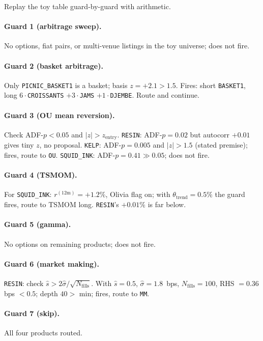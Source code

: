 Replay the toy table guard-by-guard with arithmetic.

\paragraph{Guard 1 (arbitrage sweep).} No options, fiat pairs, or
multi-venue listings in the toy universe; does not fire.

\paragraph{Guard 2 (basket arbitrage).} Only \texttt{PICNIC\_BASKET1}
is a basket; basis $z = +2.1 > 1.5$. Fires: short \texttt{BASKET1},
long $6 \cdot$\texttt{CROISSANTS} $+ 3 \cdot$\texttt{JAMS} $+ 1
\cdot$\texttt{DJEMBE}. Route and continue.

\paragraph{Guard 3 (OU mean reversion).} Check ADF-$p < 0.05$ and
$|z| > z_{\text{entry}}$. \texttt{RESIN}: ADF-$p = 0.02$ but
autocorr $+0.01$ gives tiny $z$, no proposal. \texttt{KELP}: ADF-$p
= 0.005$ and $|z| > 1.5$ (stated premise); fires, route to
\texttt{OU}. \texttt{SQUID\_INK}: ADF-$p = 0.41 \gg 0.05$; does not
fire.

\paragraph{Guard 4 (TSMOM).} For \texttt{SQUID\_INK}: $r^{(12\mathrm{m})}
= +1.2\%$, Olivia flag on; with
$\theta_{\text{trend}} = 0.5\%$ the guard fires, route to TSMOM
long. \texttt{RESIN}'s $+0.01\%$ is far below.

\paragraph{Guard 5 (gamma).} No options on remaining products; does
not fire.

\paragraph{Guard 6 (market making).} \texttt{RESIN}: check $\hat{s}
> 2\hat{\sigma}/\sqrt{N_{\text{fills}}}$. With $\hat{s} = 0.5$,
$\hat{\sigma} = 1.8$~bps, $N_{\text{fills}} = 100$, RHS $= 0.36$
bps $< 0.5$; depth $40 > $ min; fires, route to \texttt{MM}.

\paragraph{Guard 7 (skip).} All four products routed.

